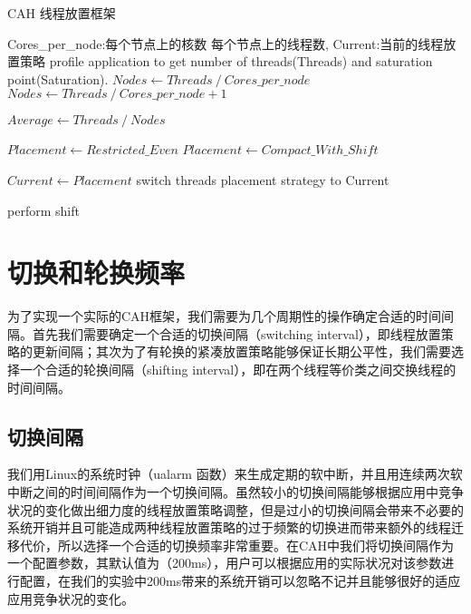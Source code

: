 \begin{algorithm}
\caption{CAH 线程放置框架}
\label{algo:mss}
\begin{algorithmic}[1] %
\Require Cores\_per\_node:每个节点上的核数 每个节点上的线程数, Current:当前的线程放置策略 %
\Repeat
{}
\State profile application to get number of threads(Threads) and saturation point(Saturation).
    \State $Nodes \gets Threads\  / \ Cores\_per\_node$
\Else
    \State $Nodes \gets Threads\  / \ Cores\_per\_node + 1$
\EndIf

\State $Average \gets Threads\  / \ Nodes$

    \State $Placement \gets Restricted\_Even$
\Else
    \State $Placement \gets Compact\_With\_Shift$
\EndIf

    \State $Current \gets Placement$
    \State switch threads placement strategy to Current 
\EndIf

    \State perform shift
\EndIf

\end{algorithmic}
\end{algorithm}

\section{切换和轮换频率}
为了实现一个实际的CAH框架，我们需要为几个周期性的操作确定合适的时间间隔。首先我们需要确定一个合适的切换间隔（switching interval），即线程放置策略的更新间隔；其次为了有轮换的紧凑放置策略能够保证长期公平性，我们需要选择一个合适的轮换间隔（shifting interval），即在两个线程等价类之间交换线程的时间间隔。

\subsection{切换间隔}
我们用Linux的系统时钟（ualarm 函数）来生成定期的软中断，并且用连续两次软中断之间的时间间隔作为一个切换间隔。虽然较小的切换间隔能够根据应用中竞争状况的变化做出细力度的线程放置策略调整，但是过小的切换间隔会带来不必要的系统开销并且可能造成两种线程放置策略的过于频繁的切换进而带来额外的线程迁移代价，所以选择一个合适的切换频率非常重要。在CAH中我们将切换间隔作为一个配置参数，其默认值为（200ms），用户可以根据应用的实际状况对该参数进行配置，在我们的实验中200ms带来的系统开销可以忽略不记并且能够很好的适应应用竞争状况的变化。

